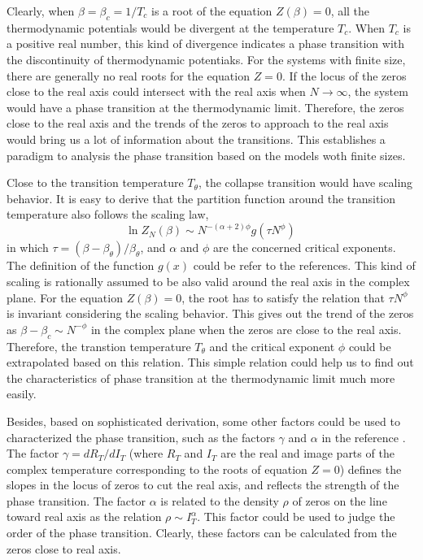 \documentclass[preprint,preprintnumbers,amsmath,amssymb,showpacs,aps,pre]{revtex4-1}
\begin{document}
Clearly, when $\beta=\beta_c=1/T_c$ is a root of the equation $Z(\beta)=0$, all
the thermodynamic potentials would be divergent at the temperature $T_c$. When
$T_c$ is a positive real number, this kind of divergence indicates a phase
transition with the discontinuity of thermodynamic potentiaks. For the systems
with finite size, there are generally no real roots for the equation $Z=0$.
If the locus of the zeros close to the real axis could intersect with the
real axis when $N\rightarrow\infty$, the system would have a phase transition
at the thermodynamic limit. Therefore, the zeros close to the real axis and
the trends of the zeros to approach to the real axis would bring us a lot of
information about the transitions. This establishes a paradigm to analysis
the phase transition based on the models woth finite sizes.

Close to the transition temperature $T_{\theta}$, the collapse transition
would have scaling behavior. It is easy to derive that the partition
function around the transition temperature also follows the scaling law,
\begin{equation}
\ln Z_N(\beta) \sim N^{-(\alpha+2)\phi} g(\tau N^{\phi}) \,
\end{equation}
in which $\tau=(\beta-\beta_{\theta})/\beta_{\theta}$, and $\alpha$ and
$\phi$ are the concerned critical exponents. The definition of the function
$g(x)$ could be refer to the references\cite{ChangPRE93}. This kind of
scaling is rationally assumed to be also valid around the real axis in
the complex plane. For the equation $Z(\beta)=0$, the root has to satisfy
the relation that $\tau N^{\phi}$ is invariant considering the scaling
behavior. This gives out the trend of the zeros as 
$\beta-\beta_c \sim N^{-\phi}$ in the complex plane when the zeros are
close to the real axis. Therefore, the
transtion temperature $T_{\theta}$ and the critical exponent $\phi$ could be
extrapolated based on this relation. This simple relation could help us to
find out the characteristics of phase transition at the thermodynamic limit
much more easily.

Besides, based on sophisticated derivation, some other factors could be used
to characterized the phase transition, such as the factors $\gamma$ and
$\alpha$ in the reference \cite{WangJCP03}. The factor $\gamma=d R_T/d I_T$
(where $R_T$ and $I_T$ are the real and image parts of the complex temperature
corresponding to the roots of equation $Z=0$) defines the slopes in the locus
of zeros to cut the real axis, and reflects the strength of the phase
transition. The factor $\alpha$ is related to the density $\rho$ of zeros on
the line toward real axis as the relation $\rho \sim I_T^{\alpha}$. This
factor could be used to judge the order of the phase transition. Clearly,
these factors can be calculated from the zeros close to real axis.
\end{document}
